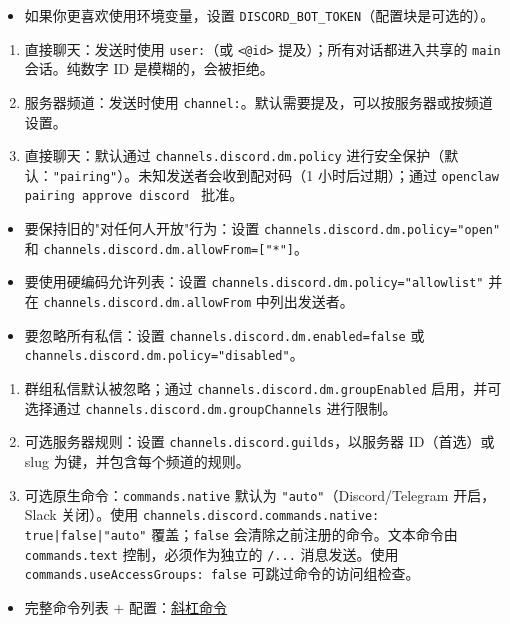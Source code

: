 \begin{itemize}
  \item 如果你更喜欢使用环境变量，设置 \texttt{DISCORD\_BOT\_TOKEN}（配置块是可选的）。
\end{itemize}

\begin{enumerate}
  \item 直接聊天：发送时使用 \texttt{user:}（或 \texttt{<@id>} 提及）；所有对话都进入共享的 \texttt{main} 会话。纯数字 ID 是模糊的，会被拒绝。
  \item 服务器频道：发送时使用 \texttt{channel:}。默认需要提及，可以按服务器或按频道设置。
  \item 直接聊天：默认通过 \texttt{channels.discord.dm.policy} 进行安全保护（默认：\texttt{"pairing"}）。未知发送者会收到配对码（1 小时后过期）；通过 \texttt{openclaw pairing approve discord } 批准。
\end{enumerate}

\begin{itemize}
  \item 要保持旧的"对任何人开放"行为：设置 \texttt{channels.discord.dm.policy="open"} 和 \texttt{channels.discord.dm.allowFrom=["*"]}。
  \item 要使用硬编码允许列表：设置 \texttt{channels.discord.dm.policy="allowlist"} 并在 \texttt{channels.discord.dm.allowFrom} 中列出发送者。
  \item 要忽略所有私信：设置 \texttt{channels.discord.dm.enabled=false} 或 \texttt{channels.discord.dm.policy="disabled"}。
\end{itemize}

\begin{enumerate}
  \item 群组私信默认被忽略；通过 \texttt{channels.discord.dm.groupEnabled} 启用，并可选择通过 \texttt{channels.discord.dm.groupChannels} 进行限制。
  \item 可选服务器规则：设置 \texttt{channels.discord.guilds}，以服务器 ID（首选）或 slug 为键，并包含每个频道的规则。
  \item 可选原生命令：\texttt{commands.native} 默认为 \texttt{"auto"}（Discord/Telegram 开启，Slack 关闭）。使用 \texttt{channels.discord.commands.native: true|false|"auto"} 覆盖；\texttt{false} 会清除之前注册的命令。文本命令由 \texttt{commands.text} 控制，必须作为独立的 \texttt{/...} 消息发送。使用 \texttt{commands.useAccessGroups: false} 可跳过命令的访问组检查。
\end{enumerate}

\begin{itemize}
  \item 完整命令列表 + 配置：\href{/tools/slash-commands}{斜杠命令}
\end{itemize}

